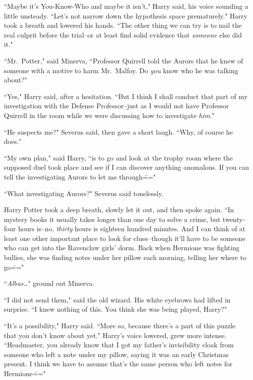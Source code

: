 ``Maybe it's You-Know-Who and maybe it isn't," Harry said, his voice sounding a little unsteady. ``Let's not narrow down the hypothesis space prematurely." Harry took a breath and lowered his hands. ``The other thing we can try is to nail the real culprit before the trial\---or at least find solid evidence that \emph{someone} else did it."

``Mr.~Potter," said Minerva, ``Professor Quirrell told the Aurors that he knew of someone with a motive to harm Mr.~Malfoy. Do \emph{you} know who he was talking about?"

``Yes," Harry said, after a hesitation. ``But I think I shall conduct that part of my investigation with the Defense Professor\---just as I would not have Professor Quirrell in the room while we were discussing how to investigate \emph{him}."

``He suspects me?" Severus said, then gave a short laugh. ``Why, of course he does."

``My own plan," said Harry, ``is to go and look at the trophy room where the supposed duel took place and see if I can discover anything anomalous. If you can tell the investigating Aurors to let me through\==="

``What investigating Aurors?" Severus said tonelessly.

Harry Potter took a deep breath, slowly let it out, and then spoke again. ``In mystery books it usually takes longer than one day to solve a crime, but twenty-four hours is\---no, \emph{thirty} hours is eighteen hundred minutes. And I can think of at least one other important place to look for clues\---though it'll have to be someone who can get into the Ravenclaw girls' dorm. Back when Hermione was fighting bullies, she was finding notes under her pillow each morning, telling her where to go\==="

``\emph{Albus{\ldots}}" ground out Minerva.

``I did not send them," said the old wizard. His white eyebrows had lifted in surprise. ``I knew nothing of this. You think she was being played, Harry?"

``It's a possibility," Harry said. ``More so, because there's a part of this puzzle that you don't know about yet." Harry's voice lowered, grew more intense. ``Headmaster, you already know that I got my father's invisibility cloak from someone who left a note under my pillow, saying it was an early Christmas present. I think we have to assume that's the same person who left notes for Hermione\==="

